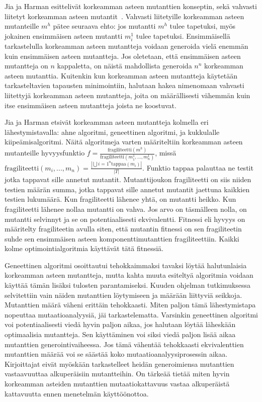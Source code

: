 \documentclass{tktltiki}
\begin{document}
Jia ja Harman esittelivät korkeamman asteen mutanttien konseptin, sekä vahvasti liitetyt korkeamman asteen mutantit~\cite{JiaH08b}. Vahvasti liitetyille korkeamman asteen mutanteille $m^h$ pätee seuraava ehto: jos mutantti $m^h$ tulee tapetuksi, myös jokainen ensimmäisen asteen mutantti $m^1_i$ tulee tapetuksi. Ensimmäisellä tarkastelulla korkeamman asteen mutantteja voidaan generoida vielä enemmän kuin ensimmäisen asteen mutantteja. Jos oletetaan, että ensimmäisen asteen mutantteja on $n$ kappaletta, on näistä mahdollista generoida $n^n$ korkeamman asteen mutanttia. Kuitenkin kun korkeamman asteen mutantteja käytetään tarkasteltavien tapausten minimointiin, halutaan hakea nimenomaan vahvasti liitettyjä korkeamman asteen mutantteja, joita on määrällisesti vähemmän kuin itse ensimmäisen asteen mutantteja joista ne koostuvat. 

Jia ja Harman etsivät korkeamman asteen mutantteja kolmella eri lähestymistavalla: ahne algoritmi, geneettinen algoritmi, ja kukkulalle kiipeämisalgoritmi. Näitä algoritmeja varten määriteltiin korkeamman asteen mutanteille hyvyysfunktio $f = \frac{\text{fragiliteetti}({m^h})}{\text{fragiliteetti}({m^1_1, ..., m^1_n})}$, missä $\text{fragiliteetti}(m_i, ..., m_n) = \frac{|\bigcup{i=1}^{n} \text{tappaa}(m_i)|}{|T|}$. Funktio $\text{tappaa}$ palauttaa ne testit jotka tappavat sille annetut mutantit. Mutanttijoukon fragiliteetti on siis niiden testien määrän summa, jotka tappavat sille annetut mutantit jaettuna kaikkien testien lukumäärä. Kun fragiliteetti lähenee yhtä, on mutantti heikko. Kun fragiliteetti lähenee nollaa mutantti on vahva. Jos arvo on täsmälleen nolla, on mutantti selvinnyt ja se on potentiaalisesti ekvivalentti. Fitnessi eli hyvyys on määritelty fragiliteetin avulla siten, että mutantin fitnessi on sen fragiliteetin suhde sen ensimmäisen asteen komponenttimutanttien fragiliteettiin. Kaikki kolme optimointialgoritmia käyttävät tätä fitnessiä. 

Geneettinen algoritmi osoittautui tehokkaimmaksi tavaksi löytää halutunlaisia korkeamman asteen mutantteja, mutta kahta muuta esiteltyä algoritmia voidaan käyttää tämän lisäksi tulosten parantamiseksi. Kuuden ohjelman tutkimuksessa selvitettiin vain näiden mutanttien löytymiseen ja määrään liittyviä seikkoja. Mutanttien määrä väheni erittäin tehokkaasti. Miten paljon tämä lähestymistapa nopeuttaa mutaatioanalyysiä, jäi tarkastelematta. Varsinkin geneettinen algoritmi voi potentiaalisesti viedä hyvin paljon aikaa, jos halutaan löytää läheskään optimaalisia mutantteja. Sen käyttäminen voi siksi viedä paljon lisää aikaa mutanttien generointivaiheessa. Jos tämä vähentää tehokkaasti ekvivalenttien mutanttien määrää voi se säästää koko mutaatioanalyysiprosessin aikaa. Kirjoittajat eivät myöskään tarkastelleet heidän generoimiensa mutanttien vastaavuuttaa alkuperäisiin mutantteihin. On tärkeää tietää miten hyvin korkeamman asteiden mutanttien mutaatiokattavuus vastaa alkuperäistä kattavuutta ennen menetelmän käyttöönottoa.
\end{document}
